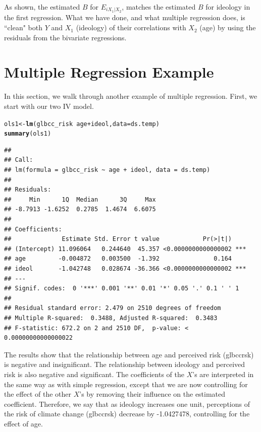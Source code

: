 \documentclass[11pt,openany]{book}\usepackage[]{graphicx}\usepackage[]{color}
\makeatletter
\newcommand{\hlopt}[1]{\textcolor[rgb]{0,0,0}{#1}}%
\newcommand{\hlstd}[1]{\textcolor[rgb]{0.345,0.345,0.345}{#1}}%
\newcommand{\hlkwb}[1]{\textcolor[rgb]{0.69,0.353,0.396}{#1}}%
\newcommand{\hlkwc}[1]{\textcolor[rgb]{0.333,0.667,0.333}{#1}}%
\newcommand{\hlkwd}[1]{\textcolor[rgb]{0.737,0.353,0.396}{\textbf{#1}}}%
\newenvironment{kframe}{%
 \def\at@end@of@kframe{}%
 \ifinner\ifhmode%
  \def\at@end@of@kframe{\end{minipage}}%
  \begin{minipage}{\columnwidth}%
 \fi\fi%
 \def\FrameCommand##1{\hskip\@totalleftmargin \hskip-\fboxsep
 \colorbox{shadecolor}{##1}\hskip-\fboxsep
     \hskip-\linewidth \hskip-\@totalleftmargin \hskip\columnwidth}%
 \MakeFramed {\advance\hsize-\width
   \@totalleftmargin\z@ \linewidth\hsize
   \@setminipage}}%
 {\par\unskip\endMakeFramed%
 \at@end@of@kframe}
\newenvironment{knitrout}{}{} %
\renewenvironment{knitrout}{\begin{singlespace}}{\end{singlespace}} %
\makeatother
\begin{document}
As shown, the estimated $B$ for $E_{iX_{1}|X_{2}}$, matches the estimated $B$ for ideology in the first regression. What we have done, and what multiple regression does, is ``clean" both $Y$ and $X_1$ (ideology) of their correlations with $X_2$ (age) by using the residuals from the bivariate regressions.
 
\section{Multiple Regression Example}



In this section, we walk through another example of multiple regression. First, we start with our two IV model. 
\begin{knitrout}
\color{fgcolor}\begin{kframe}
\begin{alltt}
\hlstd{ols1} \hlkwb{<-} \hlkwd{lm}\hlstd{(glbcc_risk} \hlopt{~} \hlstd{age} \hlopt{+} \hlstd{ideol,} \hlkwc{data} \hlstd{= ds.temp)}
\hlkwd{summary}\hlstd{(ols1)}
\end{alltt}
\begin{verbatim}
## 
## Call:
## lm(formula = glbcc_risk ~ age + ideol, data = ds.temp)
## 
## Residuals:
##     Min      1Q  Median      3Q     Max 
## -8.7913 -1.6252  0.2785  1.4674  6.6075 
## 
## Coefficients:
##              Estimate Std. Error t value            Pr(>|t|)    
## (Intercept) 11.096064   0.244640  45.357 <0.0000000000000002 ***
## age         -0.004872   0.003500  -1.392               0.164    
## ideol       -1.042748   0.028674 -36.366 <0.0000000000000002 ***
## ---
## Signif. codes:  0 '***' 0.001 '**' 0.01 '*' 0.05 '.' 0.1 ' ' 1
## 
## Residual standard error: 2.479 on 2510 degrees of freedom
## Multiple R-squared:  0.3488,	Adjusted R-squared:  0.3483 
## F-statistic: 672.2 on 2 and 2510 DF,  p-value: < 0.00000000000000022
\end{verbatim}
\end{kframe}
\end{knitrout}

The results show that the relationship between age and perceived risk (glbccrsk) is negative and insignificant. The relationship between ideology and perceived risk is also negative and significant. The coefficients of the $X$'s are interpreted in the same way as with simple regression, except that we are now controlling for the effect of the other $X$'s by removing their influence on the estimated coefficient. Therefore, we say that as ideology increases one unit, perceptions of the risk of climate change (glbccrsk) decrease by -1.0427478, controlling for the effect of age.  
\end{document}
